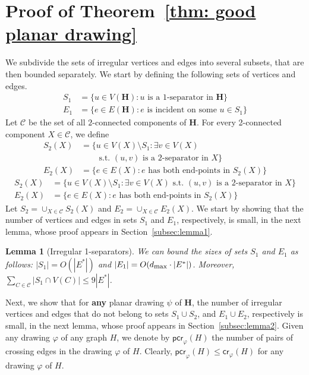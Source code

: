 \documentclass[twoside,leqno,twocolumn]{article}
\newcommand{\cset}{{\mathcal{C}}}
\newtheorem{lemma}{Lemma}
\renewcommand{\phi}{\varphi}
\newcommand{\pcro}{\mathsf{pcr}}
\newcommand{\cro}{\mathsf{cr}}
\newcommand{\dmax}{d_{\mbox{\textup{\footnotesize{max}}}}}
\renewcommand{\H}{{\mathbf{H}}}
\begin{document}
\fi



\section{Proof of Theorem~\ref{thm: good planar drawing}}\label{sec:finding a planar drawing}




We subdivide the sets of irregular vertices and edges into several subsets, that are then bounded separately. 
We start by defining the following sets of vertices and edges.
\begin{align*}
S_1 & = \{u\in V(\H) : u \mbox{ is a $1$-separator in } \H\}\\
E_1 & = \{e\in E(\H) : e \mbox{ is incident on some } u\in S_1\}
\end{align*}
Let $\cset$ be the set of all $2$-connected components of $\H$.
For every 2-connected component $X\in \cset$, we define
\ifabstract
\begin{align*}
S_2 (X)& = \{u\in V(X)\setminus S_1: \exists v\in V(X) 
\\&\phantom{{}=\{{}} \mbox{ s.t. $(u,v)$ is a $2$-separator in } X\}\\
E_2 (X)& = \{e\in E(X) : e \mbox{ has both end-points in } S_2(X)\}
\end{align*}
\fi
\iffull
\begin{align*}
S_2 (X)& = \{u\in V(X)\setminus S_1: \exists v\in V(X) \mbox{ s.t. $(u,v)$ is a $2$-separator in } X\}\\
E_2 (X)& = \{e\in E(X) : e \mbox{ has both end-points in } S_2(X)\}
\end{align*}
\fi
Let $S_2 = \cup_{X\in \cset} S_2(X)$ and $E_2 = \cup_{X\in \cset} E_2(X)$. 
We start by showing that the number of vertices and edges in sets $S_1$ and $E_1$, respectively, is small, in the next lemma, whose proof appears in Section~\ref{subsec:lemma1}.

\begin{lemma}[Irregular 1-separators]\label{lem:irregular1} We can bound the sizes of sets $S_1$  and $E_1$ as follows:
$|S_1|=O(|E^*|)$ and $|E_1| = O(\dmax \cdot |E^*|)$.
Moreover, $\sum_{C\in \cset} |S_1 \cap V(C)| \leq 9|E^*|$.
\end{lemma}

Next, we show that for {\bf any} planar drawing $\psi$ of $\H$, the number of irregular vertices and edges that do not belong to sets $S_1\cup S_2$, and $E_1\cup E_2$, respectively is small, in the next lemma, whose proof appears in Section~\ref{subsec:lemma2}.
Given any drawing $\phi$ of any graph $H$,
we denote by $\pcro_{\phi}(H)$ the number of pairs of crossing edges in the drawing $\phi$ of $H$. Clearly, $\pcro_{\phi}(H)\leq\cro_{\phi}(H)$ for any drawing $\phi$ of $H$.
\end{document}
